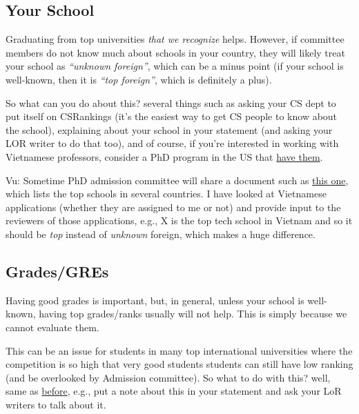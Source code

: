 \documentclass[11pt]{article}
\newenvironment{commentbox}{
 \small
    \begin{cbox}
 }{
   \end{cbox}
}
\begin{document}
\subsection{Your School}\label{sec:your-school}

Graduating from top universities \emph{that we recognize} helps.
However, if committee members do not know much about schools in your country, they will likely treat your school as
\emph{``unknown foreign''}, which can be a minus point (if your school is well-known, then it is \emph{``top foreign''}, which is definitely a plus).

So what can you do about this? several things such as asking your CS dept to put itself on CSRankings (it's the easiest way to get CS people to know about the school), explaining about your school in your statement (and asking your LOR writer to do that too), and of course, if you're interested in working with Vietnamese professors, consider a PhD program in the US that  \href{https://github.com/dynaroars/dynaroars.github.io/wiki/Viet-CS-Profs-US}{have them}.

\begin{commentbox}
Vu: Sometime PhD admission committee will share a document such as \href{https://github.com/dynaroars/dynaroars.github.io/wiki/Foreign-Top-Schools}{this one}, which lists the top schools in several countries. I have looked at Vietnamese applications (whether they are assigned to me or not) and provide input to the reviewers of those applications, e.g., X is the top tech school in Vietnam and so it should be \emph{top} instead of \emph{unknown} foreign, which makes a huge difference.
\end{commentbox}

\subsection{Grades/GREs}\label{sec:grades}
Having good grades is important, but, in general, unless your school is well-known, having top grades/ranks
usually will not help. This is simply because we cannot evaluate them.

This can be an issue for students in many top international universities where the competition is so high that very good students students can still have low ranking (and be overlooked by Admission committee).
So what to do with this? well, same as \hyperref[sec:your-school]{before}, e.g., put a note about this in your statement and ask your LoR writers to talk about it.
\end{document}
